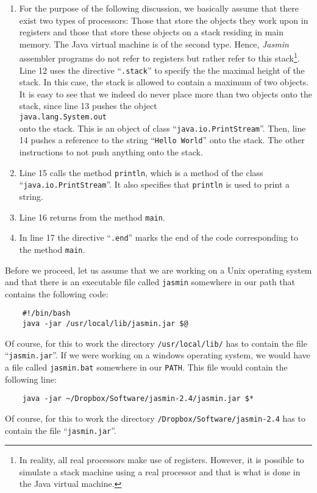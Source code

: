 \begin{enumerate}
\begin{enumerate}
  \item For the purpose of the following discussion, we basically assume that there exist two types of
        processors: Those that store the objects they work upon in registers and those that store
        these objects on a stack residing in main memory.  The Java virtual machine is of the second
        type.  Hence, \textsl{Jasmin} assembler programs do not refer to registers but rather refer to
        this stack\footnote{
          In reality, all real processors make use of registers.  However, it is possible 
          to simulate a stack machine using a real processor and that is what is done in the Java
          virtual machine.}.
        Line 12 uses the directive ``\texttt{.stack}'' to specify the the maximal height of the
        stack.  In this case, the stack is allowed to contain a maximum of two objects.  It is easy
        to see that we indeed do never place more than two objects onto the stack, since line
        13 pushes the object 
        \\[0.2cm]
        \hspace*{1.3cm}
        \texttt{java.lang.System.out}
        \\[0.2cm]
        onto the stack.  This is an object of class ``\texttt{java.io.PrintStream}''.
        Then, line 14 pushes a reference to the string ``\texttt{Hello World}'' onto the stack.
        The other instructions to not push anything onto the stack.
  \item Line 15 calls the method \texttt{println}, which is a method of the class
        ``\texttt{java.io.PrintStream}''.  It also specifies that \texttt{println} is used to print
        a string.
  \item Line 16 returns from the method \texttt{main}.
  \item In line 17 the directive ``\texttt{.end}''  marks the end of the code corresponding to the method 
        \texttt{main}.
  \end{enumerate}
\end{enumerate}
Before we proceed, let us assume that we are working on a Unix operating system and that there is an
executable file called \texttt{jasmin} somewhere in our path that contains the following code:
\begin{verbatim}
    #!/bin/bash 
    java -jar /usr/local/lib/jasmin.jar $@
\end{verbatim}
Of course, for this to work the directory \texttt{/usr/local/lib/} has to contain the file
``\texttt{jasmin.jar}''.  If we were working on a windows operating system, we would have a file
called \texttt{jasmin.bat} somewhere in our \texttt{PATH}.  This file would contain the following
line:
\begin{verbatim}
    java -jar ~/Dropbox/Software/jasmin-2.4/jasmin.jar $*
\end{verbatim}
Of course, for this to work the directory \texttt{/Dropbox/Software/jasmin-2.4} has to
contain the file ``\texttt{jasmin.jar}''.

